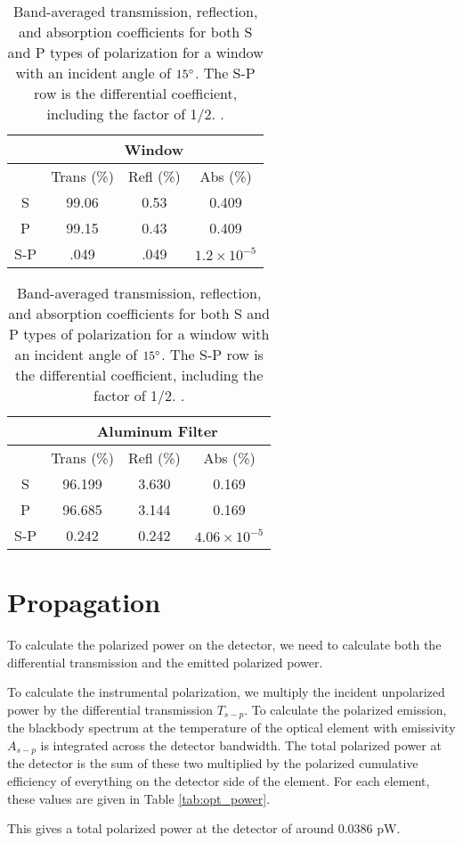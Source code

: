 \documentclass{article}
\theoremstyle{remark}
\begin{document}
\begin{table}
\centering
\begin{tabular}{|c|c|c|c|}
\hline
&\multicolumn{3}{|c|}{Window}\\
\hline
 & Trans (\%) & Refl (\%) & Abs (\%) \\
 \hline
S    & 99.06 &0.53 & 0.409\\
P    & 99.15 & 0.43  & 0.409\\
S-P & .049  & .049& $1.2\times 10^{-5}$\\
 \hline
\end{tabular}
\begin{tabular}{|c|c|c|c|}
	\hline
	&\multicolumn{3}{|c|}{Aluminum Filter}\\
	\hline
	& Trans (\%) & Refl (\%) & Abs (\%) \\
	\hline
	S    & 96.199 & 3.630 & 0.169\\
	P    & 96.685 & 3.144  & 0.169\\
	S-P & 0.242  & 0.242 & $4.06\times 10^{-5}$\\
	\hline
\end{tabular}
\caption{
	Band-averaged transmission, reflection, and absorption coefficients for both S and P types of polarization for a window with an incident angle of $15 \degree$.
	The S-P row is the differential coefficient, including the factor of 1/2.
.}
\label{tab:opt_coeffs}
\end{table}


\section{Propagation}
To calculate the polarized power on the detector, we need to calculate both the differential transmission and the emitted polarized power.

To calculate the instrumental polarization, we multiply the incident unpolarized power by the differential transmission $T_{s-p}$.
To calculate the polarized emission, the blackbody spectrum at the temperature of the optical element with emissivity $A_{s-p}$ is integrated across the detector bandwidth.
The total polarized power at the detector is the sum of these two
multiplied by the polarized cumulative efficiency of everything on the detector side of the element.
For each element, these values are given in Table \ref{tab:opt_power}.

This gives a total polarized power at the detector of around 0.0386 pW.
\end{document}
